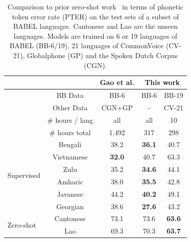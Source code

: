\begin{table}[t]
\begin{center}
\caption{Comparison to prior zero-shot work~\cite{gaozero} in terms of phonetic token error rate (PTER) on the test sets of a subset of BABEL languages. Cantonese and Lao are the unseen languages. Models are trained on 6 or 19 languages of BABEL (BB-6/19), 21 languages of CommonVoice (CV-21), Globalphone (GP) and the Spoken Dutch Corpus (CGN).\label{tab:gao_res}
}
\setlength{\tabcolsep}{4.5pt}
\begin{tabular}{@{}lc|c|cc@{}}
\toprule
& & Gao et al. \cite{gaozero} & \multicolumn{2}{|c}{This work} \\
\midrule
& BB Data          & BB-6 & BB-6 & BB-19 \\
& Other Data       & CGN+GP & - & CV-21 \\
\midrule 
& \# hours / lang &        all              & all & 10                        \\
& \# hours total               & 1,492                & 317            & 298                       \\
\midrule
\multirow{6}{*}{Supervised } & Bengali                   & 38.2                 & \textbf{36.1}    & 40.7                      \\
& Vietnamese                & \textbf{32.0}        & 40.7             & 63.3                      \\
& Zulu                      & 35.2                 & \textbf{34.6}    & 44.1                      \\
& Amharic                   & 38.0                 & \textbf{35.5}    & 42.8                      \\
& Javanese                  & 44.2                 & \textbf{40.2}    & 49.1                      \\
& Georgian                  & 38.6                 & \textbf{27.6}    & 43.2                      \\
\midrule
\multirow{2}{*}{Zero-shot} & Cantonese                 & 73.1                 & 73.6             & \textbf{63.6}             \\
& Lao                       & 69.3                 & 70.3             & \textbf{63.7}    \\ 
\bottomrule         
\end{tabular}



\end{center}
\end{table}
